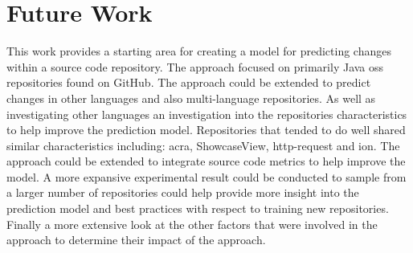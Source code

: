 \section{Future Work}

This work provides a starting area for creating a model for predicting changes within a source code repository. The approach focused on primarily Java \gls{oss} repositories found on GitHub. The approach could be extended to predict changes in other languages and also multi-language repositories. As well as investigating other languages an investigation into the repositories characteristics to help improve the prediction model. Repositories that tended to do well shared similar characteristics including: acra, ShowcaseView, http-request and ion. The approach could be extended to integrate source code metrics to help improve the model. A more expansive experimental result could be conducted to sample from a larger number of repositories could help provide more insight into the prediction model and best practices with respect to training new repositories. Finally a more extensive look at the other factors that were involved in the approach to determine their impact of the approach.
